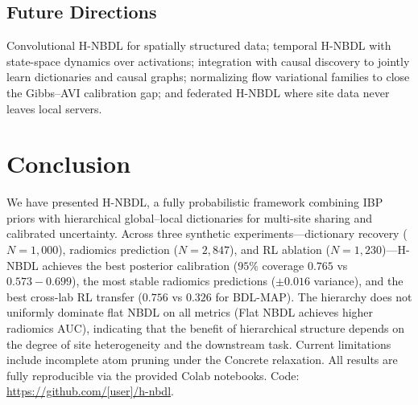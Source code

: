 \documentclass[11pt,a4paper]{article}
\theoremstyle{definition}
\begin{document}
\subsection{Future Directions}

Convolutional H-NBDL for spatially structured data; temporal H-NBDL with state-space dynamics over activations; integration with causal discovery to jointly learn dictionaries and causal graphs; normalizing flow variational families to close the Gibbs--AVI calibration gap; and federated H-NBDL where site data never leaves local servers.

\section{Conclusion}\label{sec:conclusion}

We have presented H-NBDL, a fully probabilistic framework combining IBP priors with hierarchical global--local dictionaries for multi-site sharing and calibrated uncertainty. Across three synthetic experiments---dictionary recovery ($N{=}1{,}000$), radiomics prediction ($N{=}2{,}847$), and RL ablation ($N{=}1{,}230$)---H-NBDL achieves the best posterior calibration ($95\%$ coverage $0.765$ vs $0.573{-}0.699$), the most stable radiomics predictions ($\pm 0.016$ variance), and the best cross-lab RL transfer ($0.756$ vs $0.326$ for BDL-MAP). The hierarchy does not uniformly dominate flat NBDL on all metrics (Flat NBDL achieves higher radiomics AUC), indicating that the benefit of hierarchical structure depends on the degree of site heterogeneity and the downstream task. Current limitations include incomplete atom pruning under the Concrete relaxation. All results are fully reproducible via the provided Colab notebooks. Code: \url{https://github.com/[user]/h-nbdl}.
\end{document}
